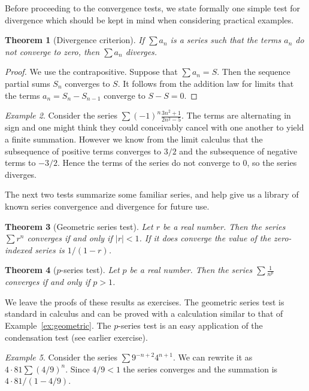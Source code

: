 \documentclass[11pt,oneside]{amsbook}
\theoremstyle{definition}
\theoremstyle{plain}
\newtheorem{theorem}{Theorem}[section]
\theoremstyle{definition}
\theoremstyle{remark}
\newtheorem{example}[theorem]{Example}
\numberwithin{equation}{section}
\numberwithin{figure}{section}
\begin{document}
Before proceeding to the convergence tests, we state formally one simple test for divergence which should be kept in mind when considering practical examples.

\begin{theorem}[Divergence criterion]
  If $\sum a_n$ is a series such that the terms $a_n$ do not converge to zero, then $\sum a_n$ diverges.
\end{theorem}

\begin{proof}
  We use the contrapositive. Suppose that $\sum a_n=S$. Then the sequence partial sums $S_n$ converges to $S$. It follows from the addition law for limits that the terms $a_n=S_n-S_{n-1}$ converge to $S-S=0$.
\end{proof}

\begin{example}
  Consider the series $\sum(-1)^n\frac{3n^2+1}{2n^2-5}$. The terms are alternating in sign and one might think they could conceivably cancel with one another to yield a finite summation. However we know from the limit calculus that the subsequence of positive terms converges to $3/2$ and the subsequence of negative terms to $-3/2$. Hence the terms of the series do not converge to $0$, so the series diverges.
\end{example}

The next two tests summarize some familiar series, and help give us a library of known series convergence and divergence for future use.

\begin{theorem}[Geometric series test]
  Let $r$ be a real number. Then the series $\sum r^n$ converges if and only if $|r|<1$. If it does converge the value of the zero-indexed series is $1/(1-r)$.
\end{theorem}

\begin{theorem}[$p$-series test]
  Let $p$ be a real number. Then the series $\sum \frac{1}{n^p}$ converges if and only if $p>1$.
\end{theorem}

We leave the proofs of these results as exercises. The geometric series test is standard in calculus and can be proved with a calculation similar to that of Example~\ref{ex:geometric}. The $p$-series test is an easy application of the condensation test (see earlier exercise).

\begin{example}
  Consider the series $\sum 9^{-n+2}4^{n+1}$. We can rewrite it as $4\cdot81\sum(4/9)^n$. Since $4/9<1$ the series converges and the summation is $4\cdot81/(1-4/9)$.
\end{example}
\end{document}
